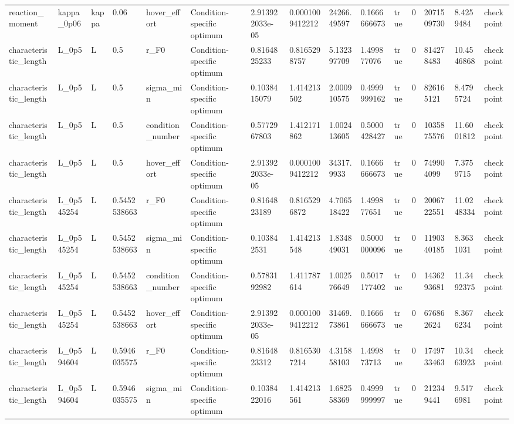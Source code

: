 \begin{tabular}{@{}lllllllllllllll@{}}
reaction\_moment & kappa\_0p06 & kappa & 0.06 & hover\_effort & Condition-specific optimum & 2.913922033e-05 & 0.0001009412212 & 24266.49597 & 0.1666666673 & true & 0 & 2071509730 & 8.4259484 & checkpoint \\
characteristic\_length & L\_0p5 & L & 0.5 & r\_F0 & Condition-specific optimum & 0.8164825233 & 0.8165298757 & 5.132397709 & 1.499877076 & true & 0 & 814278483 & 10.4546868 & checkpoint \\
characteristic\_length & L\_0p5 & L & 0.5 & sigma\_min & Condition-specific optimum & 0.1038415079 & 1.414213502 & 2.000910575 & 0.4999999162 & true & 0 & 826165121 & 8.4795724 & checkpoint \\
characteristic\_length & L\_0p5 & L & 0.5 & condition\_number & Condition-specific optimum & 0.5772967803 & 1.412171862 & 1.002413605 & 0.5000428427 & true & 0 & 1035875576 & 11.6001812 & checkpoint \\
characteristic\_length & L\_0p5 & L & 0.5 & hover\_effort & Condition-specific optimum & 2.913922033e-05 & 0.0001009412212 & 34317.9933 & 0.1666666673 & true & 0 & 749904099 & 7.3759715 & checkpoint \\
characteristic\_length & L\_0p545254 & L & 0.5452538663 & r\_F0 & Condition-specific optimum & 0.8164823189 & 0.8165296872 & 4.706518422 & 1.499877651 & true & 0 & 2006722551 & 11.0248334 & checkpoint \\
characteristic\_length & L\_0p545254 & L & 0.5452538663 & sigma\_min & Condition-specific optimum & 0.103842531 & 1.414213548 & 1.834849031 & 0.5000000096 & true & 0 & 1190340185 & 8.3631031 & checkpoint \\
characteristic\_length & L\_0p545254 & L & 0.5452538663 & condition\_number & Condition-specific optimum & 0.5783192982 & 1.411787614 & 1.002576649 & 0.5017177402 & true & 0 & 1436293681 & 11.3492375 & checkpoint \\
characteristic\_length & L\_0p545254 & L & 0.5452538663 & hover\_effort & Condition-specific optimum & 2.913922033e-05 & 0.0001009412212 & 31469.73861 & 0.1666666673 & true & 0 & 676862624 & 8.3676234 & checkpoint \\
characteristic\_length & L\_0p594604 & L & 0.5946035575 & r\_F0 & Condition-specific optimum & 0.8164823312 & 0.8165307214 & 4.315858103 & 1.499873713 & true & 0 & 1749733463 & 10.3463923 & checkpoint \\
characteristic\_length & L\_0p594604 & L & 0.5946035575 & sigma\_min & Condition-specific optimum & 0.1038422016 & 1.414213561 & 1.682558369 & 0.4999999997 & true & 0 & 212349441 & 9.5176981 & checkpoint \\

\end{tabular}
